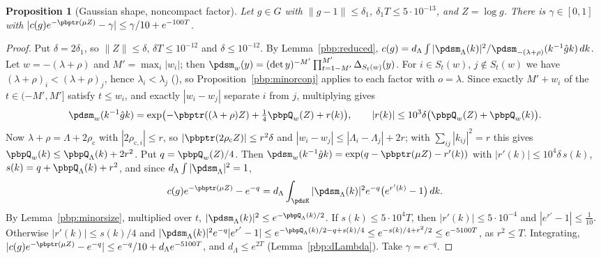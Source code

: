 \documentclass[10pt]{amsart}
\newtheorem{proposition}[theorem]{Proposition}
\theoremstyle{definition}
\theoremstyle{remark}
\begin{document}
\begin{proposition}[Gaussian shape, noncompact factor]\label{pbp:gauss}
Let $g\in G$ with $\|g-1\|\le\delta_1$, $\delta_1T\le5\cdot10^{-13}$, and $Z=\log g$. There is
$\gamma\in[0,1]$ with $|c(g)e^{-\pbptr(\mu Z)}-\gamma|\le\gamma/10+e^{-100T}$.
\end{proposition}
\begin{proof}
Put $\delta=2\delta_1$, so $\|Z\|\le\delta$, $\delta T\le10^{-12}$ and $\delta\le10^{-12}$. By
Lemma~\ref{pbp:reduced}, $c(g)=d_\Lambda\int|\pdsm_\Lambda(k)|^2/\allowbreak \pdsm_{-(\lambda+\rho)}(k^{-1}\hat gk)\,dk$.
Let $w=-(\lambda+\rho)$ and $M'=\max_i|w_i|$; then $\pdsm_w(y)=(\det y)^{-M'}\prod_{t=1-M'}^{M'}
\Delta_{S_t(w)}(y)$. For $i\in S_t(w)$, $j\notin S_t(w)$ we have $(\lambda+\rho)_i<(\lambda+\rho)_j$,
hence $\lambda_i<\lambda_j$ ({\cite[Lemma~3.18(c)]{P49}}), so Proposition~\ref{pbp:minorconj} applies to
each factor with $o=\lambda$. Since exactly $M'+w_i$ of the $t\in(-M',M']$ satisfy $t\le w_i$, and exactly
$|w_i-w_j|$ separate $i$ from $j$, multiplying gives
\[
\pdsm_w(k^{-1}\hat gk)=\exp\bigl(-\pbptr((\lambda+\rho)Z)+\tfrac14\pbpQ_w(Z)+r(k)\bigr),\qquad|r(k)|\le
10^3\delta\bigl(\pbpQ_w(Z)+\pbpQ_w(k)\bigr).
\]
Now $\lambda+\rho=\Lambda+2\rho_{\mathrm c}$ with $|2\rho_{\mathrm c,i}|\le r$, so $|\pbptr(2\rho_{\mathrm c}Z)|
\le r^2\delta$ and $|w_i-w_j|\le|\Lambda_i-\Lambda_j|+2r$; with $\sum_{ij}|k_{ij}|^2=r$ this gives
$\pbpQ_w(k)\le\pbpQ_\Lambda(k)+2r^2$. Put $q=\pbpQ_w(Z)/4$. Then $\pdsm_w(k^{-1}\hat gk)=\exp(q-
\pbptr(\mu Z)-r'(k))$ with $|r'(k)|\le10^4\delta\,s(k)$, $s(k)=q+\pbpQ_\Lambda(k)+r^2$, and since
$d_\Lambda\int|\pdsm_\Lambda|^2=1$,
\[
c(g)e^{-\pbptr(\mu Z)}-e^{-q}=d_\Lambda\int_{\pdsK}|\pdsm_\Lambda(k)|^2e^{-q}\bigl(e^{r'(k)}-1\bigr)\,dk .
\]
By Lemma~\ref{pbp:minorsize}, multiplied over $t$, $|\pdsm_\Lambda(k)|^2\le e^{-\pbpQ_\Lambda(k)/2}$. If
$s(k)\le5\cdot10^4T$, then $|r'(k)|\le5\cdot10^{-4}$ and $|e^{r'}-1|\le\frac1{10}$. Otherwise $|r'(k)|\le
s(k)/4$ and $|\pdsm_\Lambda(k)|^2e^{-q}|e^{r'}-1|\le e^{-\pbpQ_\Lambda(k)/2-q+s(k)/4}\le e^{-s(k)/4+r^2/2}
\le e^{-5100T}$, as $r^2\le T$. Integrating, $|c(g)e^{-\pbptr(\mu Z)}-e^{-q}|\le e^{-q}/10+d_\Lambda
e^{-5100T}$, and $d_\Lambda\le e^{2T}$ (Lemma~\ref{pbp:dLambda}). Take $\gamma=e^{-q}$.
\end{proof}
\end{document}
